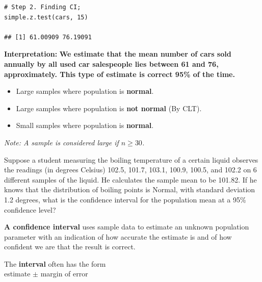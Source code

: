 \begin{example}
\begin{tcolorbox}[colback=gray!10, colframe=gray!50, arc=2mm]
\begin{verbatim}
# Step 2. Finding CI;
simple.z.test(cars, 15)

## [1] 61.00909 76.19091
\end{verbatim}
\end{tcolorbox}

\vspace{1em}

\noindent\textbf{Interpretation:} \textbf{We estimate that the mean number of cars sold annually by all used car salespeople lies between 61 and 76, approximately. This type of estimate is correct 95\% of the time.}

\end{example}

\begin{tcolorbox}[colback=blue!5!white, colframe=blue!75!black,
  title=\textbf{Cases Where Valid}, fonttitle=\bfseries,
  coltitle=white, colbacktitle=blue!90!black, arc=2mm]

\begin{itemize}
  \item Large samples where population is \textbf{normal}.
  \item Large samples where population is \textbf{not normal} (By CLT).
  \item Small samples where population is \textbf{normal}.
\end{itemize}

\textit{Note: A sample is considered large if $n \geq 30$.}
\end{tcolorbox}

\begin{example}
Suppose a student measuring the boiling temperature of a certain liquid observes the readings (in degrees Celsius) 102.5, 101.7, 103.1, 100.9, 100.5, and 102.2 on 6 different samples of the liquid. He calculates the sample mean to be 101.82. If he knows that the distribution of boiling points is Normal, with standard deviation 1.2 degrees, what is the confidence interval for the population mean at a 95\% confidence level?\\
\end{example}
\textbf{A confidence interval} uses sample data to estimate an unknown population parameter with an indication of how accurate the estimate is and of how confident we are that the result is correct.

\vspace{1em}

The \textbf{interval} often has the form\\
\hspace*{2em}estimate $\pm$ margin of error

